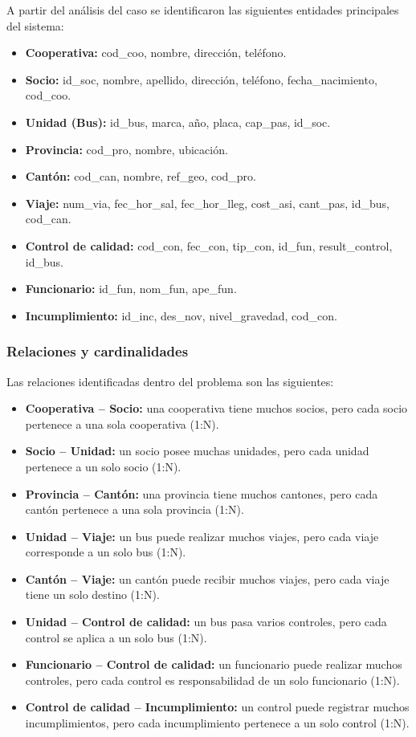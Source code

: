 \documentclass{article}
\begin{document}
A partir del análisis del caso se identificaron las siguientes entidades principales del sistema:

\begin{itemize}
    \item \textbf{Cooperativa:} cod\_coo, nombre, dirección, teléfono.
    \item \textbf{Socio:} id\_soc, nombre, apellido, dirección, teléfono, fecha\_nacimiento, cod\_coo.
    \item \textbf{Unidad (Bus):} id\_bus, marca, año, placa, cap\_pas, id\_soc.
    \item \textbf{Provincia:} cod\_pro, nombre, ubicación.
    \item \textbf{Cantón:} cod\_can, nombre, ref\_geo, cod\_pro.
    \item \textbf{Viaje:} num\_via, fec\_hor\_sal, fec\_hor\_lleg, cost\_asi, cant\_pas, id\_bus, cod\_can.
    \item \textbf{Control de calidad:} cod\_con, fec\_con, tip\_con, id\_fun, result\_control, id\_bus.
    \item \textbf{Funcionario:} id\_fun, nom\_fun, ape\_fun.
    \item \textbf{Incumplimiento:} id\_inc, des\_nov, nivel\_gravedad, cod\_con.
\end{itemize}

\subsubsection{Relaciones y cardinalidades}

Las relaciones identificadas dentro del problema son las siguientes:

\begin{itemize}
    \item \textbf{Cooperativa -- Socio:} una cooperativa tiene muchos socios, pero cada socio pertenece a una sola cooperativa (1:N).
    \item \textbf{Socio -- Unidad:} un socio posee muchas unidades, pero cada unidad pertenece a un solo socio (1:N).
    \item \textbf{Provincia -- Cantón:} una provincia tiene muchos cantones, pero cada cantón pertenece a una sola provincia (1:N).
    \item \textbf{Unidad -- Viaje:} un bus puede realizar muchos viajes, pero cada viaje corresponde a un solo bus (1:N).
    \item \textbf{Cantón -- Viaje:} un cantón puede recibir muchos viajes, pero cada viaje tiene un solo destino (1:N).
    \item \textbf{Unidad -- Control de calidad:} un bus pasa varios controles, pero cada control se aplica a un solo bus (1:N).
    \item \textbf{Funcionario -- Control de calidad:} un funcionario puede realizar muchos controles, pero cada control es responsabilidad de un solo funcionario (1:N).
    \item \textbf{Control de calidad -- Incumplimiento:} un control puede registrar muchos incumplimientos, pero cada incumplimiento pertenece a un solo control (1:N).
\end{itemize}
\end{document}
